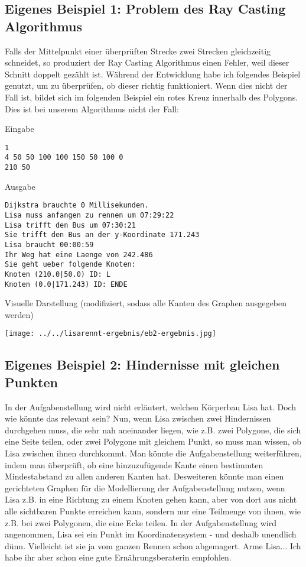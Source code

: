 \documentclass[a4paper,10pt,ngerman]{scrartcl}
\begin{document}
\subsection{Eigenes Beispiel 1: Problem des Ray Casting Algorithmus}
Falls der Mittelpunkt einer überprüften Strecke zwei Strecken gleichzeitig schneidet, so produziert der Ray Casting Algorithmus einen Fehler, weil dieser Schnitt doppelt gezählt ist. Während der Entwicklung habe ich folgendes Beispiel genutzt, um zu überprüfen, ob dieser richtig funktioniert. Wenn dies nicht der Fall ist, bildet sich im folgenden Beispiel ein rotes Kreuz innerhalb des Polygons. Dies ist bei unserem Algorithmus nicht der Fall: \medskip

\noindent Eingabe
\begin{lstlisting}
1
4 50 50 100 100 150 50 100 0
210 50
\end{lstlisting}
Ausgabe
\begin{lstlisting}
Dijkstra brauchte 0 Millisekunden.
Lisa muss anfangen zu rennen um 07:29:22
Lisa trifft den Bus um 07:30:21
Sie trifft den Bus an der y-Koordinate 171.243
Lisa braucht 00:00:59
Ihr Weg hat eine Laenge von 242.486
Sie geht ueber folgende Knoten:
Knoten (210.0|50.0) ID: L
Knoten (0.0|171.243) ID: ENDE
\end{lstlisting}
Visuelle Darstellung (modifiziert, sodass alle Kanten des Graphen ausgegeben werden)
\begin{center}
\texttt{[image: ../../lisarennt-ergebnis/eb2-ergebnis.jpg]} 
\end{center}
\subsection{Eigenes Beispiel 2: Hindernisse mit gleichen Punkten}
In der Aufgabenstellung wird nicht erläutert, welchen Körperbau Lisa hat. Doch wie könnte das relevant sein? Nun, wenn Lisa zwischen zwei Hindernissen durchgehen muss, die sehr nah aneinander liegen, wie z.B. zwei Polygone, die sich eine Seite teilen, oder zwei Polygone mit gleichem Punkt, so muss man wissen, ob Lisa zwischen ihnen durchkommt. Man könnte die Aufgabenstellung weiterführen, indem man überprüft, ob eine hinzuzufügende Kante einen bestimmten Mindestabstand zu allen anderen Kanten hat. Desweiteren könnte man einen gerichteten Graphen für die Modellierung der Aufgabenstellung nutzen, wenn Lisa z.B. in eine Richtung zu einem Knoten gehen kann, aber von dort aus nicht alle sichtbaren Punkte erreichen kann, sondern nur eine Teilmenge von ihnen, wie z.B. bei zwei Polygonen, die eine Ecke teilen. In der Aufgabenstellung wird angenommen, Lisa sei ein Punkt im Koordinatensystem - und deshalb unendlich dünn. Vielleicht ist sie ja vom ganzen Rennen schon abgemagert. Arme Lisa... Ich habe ihr aber schon eine gute Ernährungsberaterin empfohlen.\medskip
\end{document}
